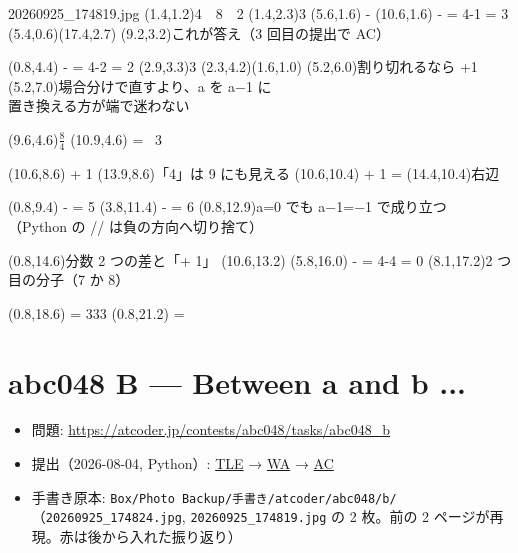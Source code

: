 \documentclass[a4paper]{article}
\begin{document}
\begin{memopage}{20260925\_174819.jpg}
  \hw(1.4,1.2){4\ \ 8\ \ 2}
  \hw(1.4,2.3){3}
  \hwm(5.6,1.6){ - }
  \hwm(10.6,1.6){ -  = 4-1 = 3}
  \redbox(5.4,0.6)(17.4,2.7)
  \redpen(9.2,3.2){これが答え（3 回目の提出で AC）}

  \hwm(0.8,4.4){ -  = 4-2 = 2}
  \hw(2.9,3.3){\normalsize 3}
  \hwcircle(2.3,4.2)(1.6,1.0)
  \hw(5.2,6.0){割り切れるなら +1}
  \redpen(5.2,7.0){場合分けで直すより、a を a−1 に\\置き換える方が端で迷わない}

  \hwstrike(9.6,4.6){$\frac{8}{4}$}
  \hwm(10.9,4.6){ = \ 3}

  \hwm(10.6,8.6){ + 1}
  \hwunread(13.9,8.6){「4」は 9 にも見える}
  \hwm(10.6,10.4){ + 1 =}
  \hwunread(14.4,10.4){右辺}

  \hwm(0.8,9.4){ -  = 5 }
  \hwm(3.8,11.4){ -  = 6}
  \redpen(0.8,12.9){a=0 でも a−1=−1 で成り立つ\\（Python の {\hwlfont //} は負の方向へ切り捨て）}

  \hwunread(0.8,14.6){分数 2 つの差と「+ 1」}
  \hwm(10.6,13.2){}
  \hwm(5.8,16.0){ -  = 4-4 = 0}
  \hwunread(8.1,17.2){2 つ目の分子（7 か 8）}

  \hwm(0.8,18.6){ = 333}
  \hwm(0.8,21.2){ =}
\end{memopage}

\clearpage
\section*{abc048 B --- Between a and b ...}

\begin{itemize}
  \item 問題: \url{https://atcoder.jp/contests/abc048/tasks/abc048_b}
  \item 提出（2026-08-04, Python）:
    \href{https://atcoder.jp/contests/abc048/submissions/78115809}{TLE} →
    \href{https://atcoder.jp/contests/abc048/submissions/78115968}{WA} →
    \href{https://atcoder.jp/contests/abc048/submissions/78116111}{AC}
  \item 手書き原本: \texttt{Box/Photo Backup/手書き/atcoder/abc048/b/}（\texttt{20260925\_174824.jpg}, \texttt{20260925\_174819.jpg} の 2 枚。前の 2 ページが再現。赤は後から入れた振り返り）
\end{itemize}
\end{document}
